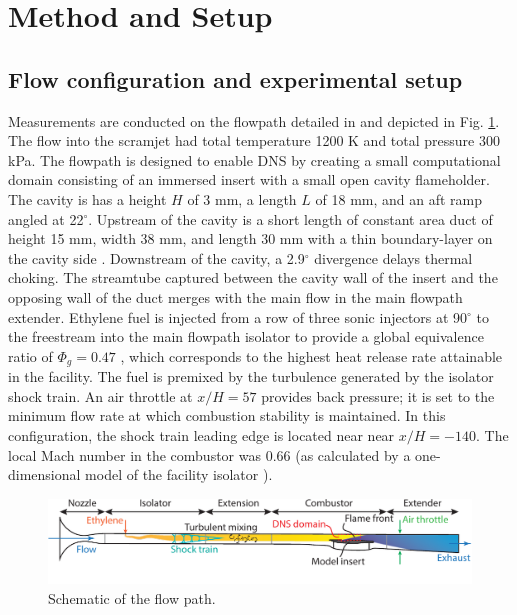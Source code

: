 \section*{Method and Setup}\label{sec:ch3_method_setup}

\subsection*{Flow configuration and experimental setup}
Measurements are conducted on the flowpath detailed in \cite{LieberGoyneRockwellEtAl2018a} and depicted in Fig. \ref{fig:ch3_flowpath}. The flow into the scramjet had total temperature 1200 K and total pressure 300 kPa. The flowpath is designed to enable DNS by creating a small computational domain consisting of an immersed insert with a small open cavity flameholder. The cavity is has a height $H$ of 3 mm, a length $L$ of 18 mm, and an aft ramp angled at 22$^\circ$. Upstream of the cavity is a short length of constant area duct of height 15 mm, width 38 mm, and length 30 mm with a thin boundary-layer on the cavity side \citep{LieberThesis}. Downstream of the cavity, a 2.9$^\circ$ divergence delays thermal choking. The streamtube captured between the cavity wall of the insert and the opposing wall of the duct merges with the main flow in the main flowpath extender. Ethylene fuel is injected from a row of three sonic injectors at 90$^\circ$ to the freestream into the main flowpath isolator to provide a global equivalence ratio of $\Phi_g=0.47$  \cite{RockwellGoyneChelliahEtAl2017}, which corresponds to the highest heat release rate attainable in the facility. The fuel is premixed by the turbulence generated by the isolator shock train. An air throttle at $x/H=57$ provides back pressure; it is set to the minimum flow rate at which combustion stability is maintained. In this configuration, the shock train leading edge is located near near $x/H=-140$. The local Mach number in the combustor was 0.66 (as calculated by a one-dimensional model of the facility isolator \cite{HeiserPrattDaleyEtAl1994}).

\begin{figure}[!hbt]
\centering
\includegraphics[width=6.5in]{figures/PIV-PLIFsetup/pivplifSmallcavity-crop.pdf} %
\caption{Schematic of the flow path.}\label{fig:ch3_flowpath}
\end{figure}

